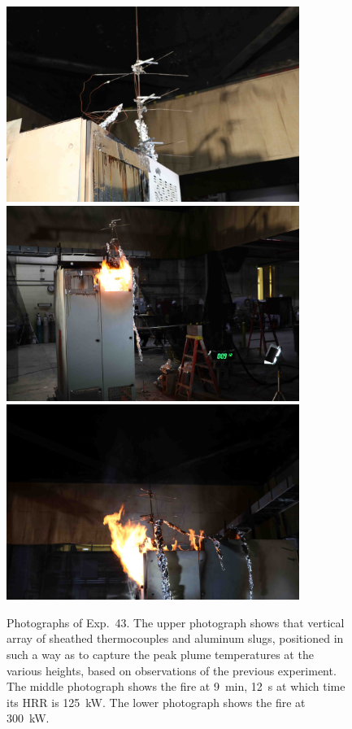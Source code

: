 \begin{figure}[p]
\centering
\includegraphics[height=2.50in]{../FIGURES/Test_43_setup} \\ \vspace{0.1in}
\includegraphics[height=2.50in]{../FIGURES/Test_43_9_min_12_s} \\ \vspace{0.1in}
\includegraphics[height=2.50in]{../FIGURES/Test_43_side}
\caption[Photographs of Exp.~43]{Photographs of Exp.~43. The upper photograph shows that vertical array of sheathed thermocouples and aluminum slugs, positioned in such a way as to capture the peak plume temperatures at the various heights, based on observations of the previous experiment. The middle photograph shows the fire at 9~min, 12~s at which time its HRR is 125~kW. The lower photograph shows the fire at 300~kW.}
\label{fig:Test_43_photos}
\end{figure}


